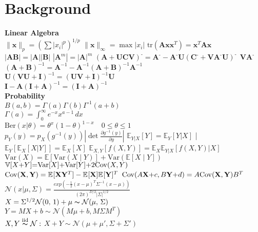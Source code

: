 \section*{Background}
\textbf{Linear Algebra}\\
$\| \mathbf{x} \|_p = \left( \sum |x_i|^p \right)^{1/p}$ \quad $\| \mathbf{x} \|_\infty = \max |x_i|$  
$\text{tr} (\mathbf{A} \mathbf{x} \mathbf{x}^T) = \mathbf{x}^T \mathbf{A} \mathbf{x}$ \\ $| \mathbf{A} \mathbf{B} | = | \mathbf{A} | | \mathbf{B} |$ \quad
$| \mathbf{A}^m | = | \mathbf{A} |^m$ 
$(\mathbf{A} {+} \mathbf{U} \mathbf{C} \mathbf{V})^{\text{-}} {=} \mathbf{A}^{\text{-}} {-} \mathbf{A}^{\text{-}} \mathbf{U} (\mathbf{C}^{\text{-}} {+} \mathbf{V} \mathbf{A}^{\text{-}} \mathbf{U})^{\text{-}} \ \ \mathbf{V} \mathbf{A}^{\text{-}}$ \\
$(\mathbf{A} + \mathbf{B})^{-1} = \mathbf{A}^{-1} - \mathbf{A}^{-1} (\mathbf{A} + \mathbf{B})^{-1} \mathbf{A}^{-1}$ \\
$\mathbf{U} (\mathbf{V} \mathbf{U} + \mathbf{I})^{-1} = (\mathbf{U} \mathbf{V} + \mathbf{I})^{-1} \mathbf{U}$ \\
$\mathbf{I} - \mathbf{A} (\mathbf{I} + \mathbf{A})^{-1} = (\mathbf{I} + \mathbf{A})^{-1}$
\vspace{6px}\\
\textbf{Probability}\\
$B(a,b) = \Gamma(a) \Gamma(b)\Gamma^{\text{-1}}(a {+} b)$ \\
$\Gamma(a) = \int_{0}^{\infty} e^{-x} x^{a-1} \,dx$ \\ 
$\text{Ber}(x|\theta) = \theta^x(1-\theta)^{1-x} \quad 0 \leq \theta \leq 1$ \\
$p_{Y}(y) = p_{X}(g^{-1}(y)) \left| \det \frac{\partial g^{-1}(y)}{\partial y} \right|$
$\mathbb{E}_{Y|X}[Y]{=}\mathbb{E}_{Y}[Y|X]$ | $\mathbb{E}_{Y}[\mathbb{E}_{X}[X|Y]] {=} \mathbb{E}_{X}[X]$
$\mathbb{E}_{X,Y}[f(X,Y)]=\mathbb{E}_{X}\mathbb{E}_{Y|X}[f(X,Y)|X]$
$\text{Var}(X) {=} \mathbb{E}[\text{Var}(X \mid Y)] {+} \text{Var}(\mathbb{E}[X \mid Y])$  
$\mathbb{V}[X{+}Y]{=}\mathrm{Var}[X]{+}\mathrm{Var}[Y]{+}2\Cov(X, Y)$ \\
$\mathrm{Cov}(\bX ,\bY)=\E[]{\bX \bY^T} - \E[]{\bX }\E[]{\bY}^T$
$\mathrm{Cov}(A\bX{+}c ,B\bY{+}d)=A\mathrm{Cov}(\bX ,\bY)B^T$ 
$\mathcal{N}(x|\mu, \Sigma)= \frac{exp(-\frac{1}{2}(x-\mu)^T\Sigma^{-1}(x-\mu))}{(2\pi)^{D/2}|\Sigma|^{1/2}} $\\
$ X = \Sigma^{1/2} \NNormal + \mu \sampled \Normal{\mu}{\Sigma}$ \\
$ Y = M X {+} b \sim \mathcal{N}(M\mu {+} b, M \Sigma M^T)$ \\
$ X,Y \overset{\mathrm{iid}}{\sampled} \mathcal{N}:$ \quad $X{+}Y \sim \mathcal{N}(\mu {+} \mu', \Sigma {+} \Sigma')$

